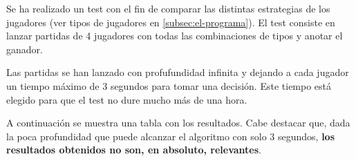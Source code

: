 Se ha realizado un test con el fin de comparar las distintas estrategias de los
jugadores (ver tipos de jugadores en \ref{subsec:el-programa}). El test consiste
en lanzar partidas de 4 jugadores con todas las combinaciones de tipos y anotar
el ganador.

Las partidas se han lanzado con profufundidad infinita y dejando a cada jugador
un tiempo máximo de 3 segundos para tomar una decisión. Este tiempo está elegido
para que el test no dure mucho más de una hora.

A continuación se muestra una tabla con los resultados. Cabe destacar que, dada
la poca profundidad que puede alcanzar el algoritmo con solo 3 segundos,
\textbf{los resultados obtenidos no son, en absoluto, relevantes}.

\newcommand\hcell[1]{\cellcolor[HTML]{C0C0C0}\textbf{#1}}
\newcommand\multcol[1]{\multicolumn{1}{|r}{\hcell{#1}}}
